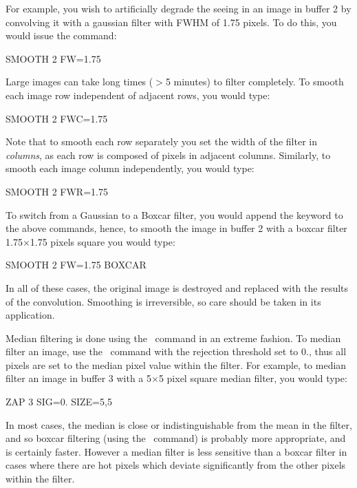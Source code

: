 For example, you wish to artificially degrade the seeing in an image in buffer
2 by convolving it with a gaussian filter with FWHM of 1.75 pixels.  To do
this, you would issue the command:
\begin{command}
      \item SMOOTH 2 FW=1.75
\end{command}
Large images can take long times ($>$5 minutes) to filter completely.  To
smooth each image row independent of adjacent rows, you would type:
\begin{command}
      \item SMOOTH 2 FWC=1.75
\end{command}
Note that to smooth each row separately you set the width of the
filter in {\it columns}, as each row is composed of pixels in
adjacent columns.  Similarly, to smooth each image column independently, you
would type:
\begin{command}
      \item SMOOTH 2 FWR=1.75
\end{command}
To switch from a Gaussian to a Boxcar filter, you would append the
 keyword to the above commands, hence, to smooth the image in
buffer 2 with a boxcar filter 1.75$\times$1.75 pixels square you would type: 
\begin{command}
      \item SMOOTH 2 FW=1.75 BOXCAR
\end{command}
In all of these cases, the original image is destroyed and replaced with the
results of the convolution.  Smoothing is irreversible, so care should be
taken in its application. 

Median filtering is done using the \ command in an extreme fashion.
To median filter an image, use the \ command with the rejection
threshold set to 0., thus all pixels are set to the median pixel value within
the filter.  For example, to median filter an image in buffer 3 with a
5$\times$5 pixel square median filter, you would type: 
\begin{command}
      \item ZAP 3 SIG=0. SIZE=5,5
\end{command}
In most cases, the median is close or indistinguishable from the mean in the
filter, and so boxcar filtering (using the \ command) is probably
more appropriate, and is certainly faster.  However a median filter is less
sensitive than a boxcar filter in cases where there are hot pixels which
deviate significantly from the other pixels within the filter. 

